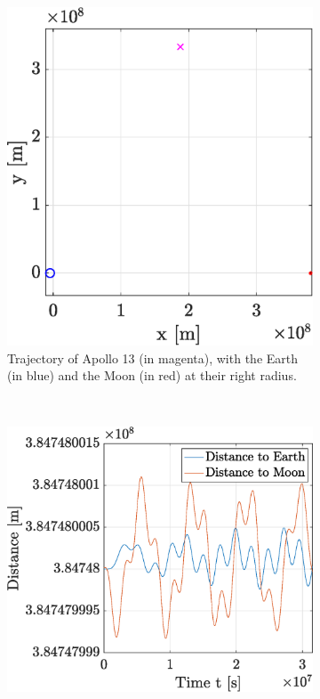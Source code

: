 \documentclass[a4paper,12pt,twoside]{article}
\begin{document}
\begin{figure}[h]
  \centering
  \begin{subfigure}[t]{0.4\textwidth}
    \includegraphics[width=\textwidth]{graphs/ex6a_traj.eps}
    \caption{Trajectory of Apollo 13 (in magenta), with the Earth (in blue) and the Moon (in red) at their right radius.}
    \label{fig:6a_traj}
  \end{subfigure}
  ~
  \begin{subfigure}[t]{0.55\textwidth}
    \includegraphics[width=\textwidth]{graphs/ex6a_dist.eps}

\end{subfigure}
\end{figure}
\end{document}
